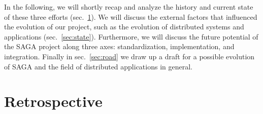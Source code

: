 \documentclass[]{article}
\begin{document}


In the following, we will shortly recap and analyze the history
and current state of these three efforts (sec.~\ref{sec:retro}). We
will discuss the external factors that influenced the evolution of our
project, such as the evolution of distributed systems and
applications (sec.~\ref{sec:state}). Furthermore, we will discuss 
the future potential of the SAGA project along three axes: standardization,
implementation, and integration. Finally in sec.~\ref{sec:road} we draw 
up a draft for a possible evolution of SAGA and the field of distributed applications in general. 



\section{Retrospective}
\label{sec:retro}
\end{document}
